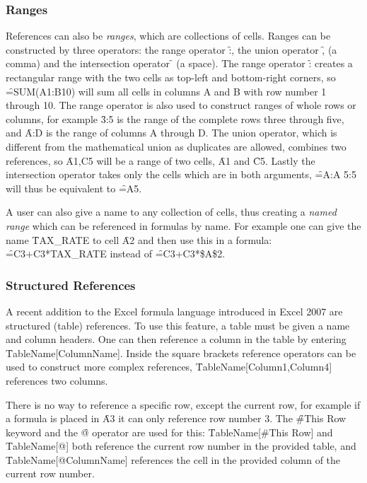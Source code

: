 \subsubsection{Ranges}
References can also be \emph{ranges}, which are collections of cells.
Ranges can be constructed by three operators: the range operator \f{:}, the union operator \f{,} (a comma) and the intersection operator \f{} (a space).
The range operator \f{:} creates a rectangular range with the two cells as top-left and bottom-right corners, so \f{=SUM(A1:B10)} will sum all cells in columns A and B with row number 1 through 10.
The range operator is also used to construct ranges of whole rows or columns, for example \f{3:5} is the range of the complete rows three through five, and \f{A:D} is the range of columns A through D.
The union operator, which is different from the mathematical union as duplicates are allowed, combines two references, so \f{A1,C5} will be a range of two cells, \f{A1} and \f{C5}.
Lastly the intersection operator takes only the cells which are in both arguments, \f{=A:A 5:5} will thus be equivalent to \f{=A5}.

A user can also give a name to any collection of cells, thus creating a \emph{named range} which can be referenced in formulas by name.
For example one can give the name \f{TAX\_RATE} to cell \f{A2} and then use this in a formula: \f{=C3+C3*TAX\_RATE} instead of \f{=C3+C3*\$A\$2}.

\subsubsection{Structured References}

A recent addition to the Excel formula language introduced in Excel 2007 are structured (table) references.
To use this feature, a table must be given a name and column headers.
One can then reference a column in the table by entering \f{TableName[ColumnName]}.
Inside the square brackets reference operators can be used to construct more complex references, \f{TableName[Column1,Column4]} references two columns.

There is no way to reference a specific row, except the current row, for example if a formula is placed in \f{A3} it can only reference row number 3.
The \f{\#This Row} keyword and the \f{@} operator are used for this: \f{TableName[\#This Row]} and \f{TableName[@]} both reference the current row number in the provided table, and \f{TableName[@ColumnName]} references the cell in the provided column of the current row number.

